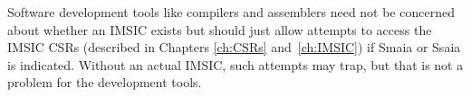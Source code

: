 Software development tools like compilers and assemblers need not
be concerned about whether an IMSIC exists but should just
allow attempts to access the IMSIC CSRs (described in Chapters
\ref{ch:CSRs} and~\ref{ch:IMSIC}) if Smaia or Ssaia is indicated.
Without an actual IMSIC, such attempts may trap,
but that is not a problem for the development tools.


